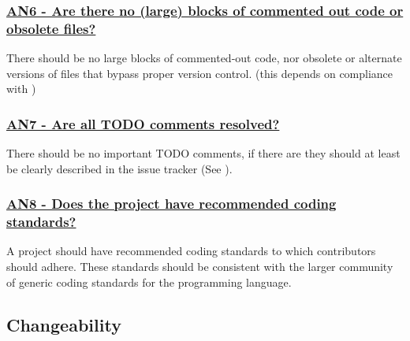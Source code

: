 \documentclass[a4paper,11pt]{article}
\newcommand{\criterion}[2]{\subsubsection*{\underline{#1 - #2}}\label{id:#1}}
\newcommand\CheckTable{%
  \begin{tabular}{ccccc}
    No & Minimal & Adequate & Good & Perfect \\
    0 & 1 & 2 & 3 & 4 \\
    \hline
    $\square$ & $\square$ & $\square$ & $\square$ & $\square$ \\
  \end{tabular}%
}
\newcommand{\refcrit}[1]{%
 \framebox[1.1\width]{\hyperref[id:#1]{#1}}
}
\begin{document}
\newcommand{\anSixID}{AN6}
\newcommand{\anSixText}{Are there no (large) blocks of commented out code or obsolete files?}
\criterion{\anSixID}{\anSixText}

There should be no large blocks of commented-out code, nor obsolete or
alternate versions of files that bypass proper version control.
(this depends on compliance with \refcrit{AC1})


\newcommand{\anSevenID}{AN7}
\newcommand{\anSevenText}{Are all TODO comments resolved?}
\criterion{\anSevenID}{\anSevenText}

There should be no important TODO comments, if there are they should at least be
clearly described in the issue tracker (See \refcrit{SP2}).


\newcommand{\anEightID}{AN8}
\newcommand{\anEightText}{Does the project have recommended coding standards?}
\criterion{\anEightID}{\anEightText}

A project should have recommended coding standards to which contributors
should adhere. These standards should be consistent with the larger community
of generic coding standards for the programming language.

\subsection{Changeability}\label{sec:cha}
%
%
%
\end{document}
